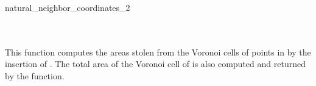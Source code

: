 \begin{ccRefFunction}{natural_neighbor_coordinates_2}
\ccSeeAlso
{} \\
\\ 
 \\

\ccImplementation This function computes the areas stolen from the
Voronoi cells of points in  by the insertion of . The
total area of the Voronoi cell of  is also computed and
returned by the function.

\end{ccRefFunction}


